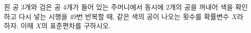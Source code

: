 흰 공 $3$개와 검은 공 $4$개가 들어 있는 주머니에서 동시에 $2$개의 공을 꺼내어 색을 확인하고 다시 넣는 시행을 $49$번 반복할 때, 같은 색의 공이 나오는 횟수를 확률변수 $X$라 하자. 이때 $X$의 표준편차를 구하시오.
